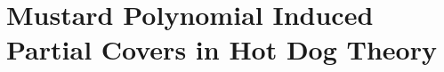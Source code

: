 \chapter{Mustard Polynomial Induced Partial Covers in Hot Dog Theory}
\label{paper2}



\break



\break
\singlespacing
{}
\doublespacing
